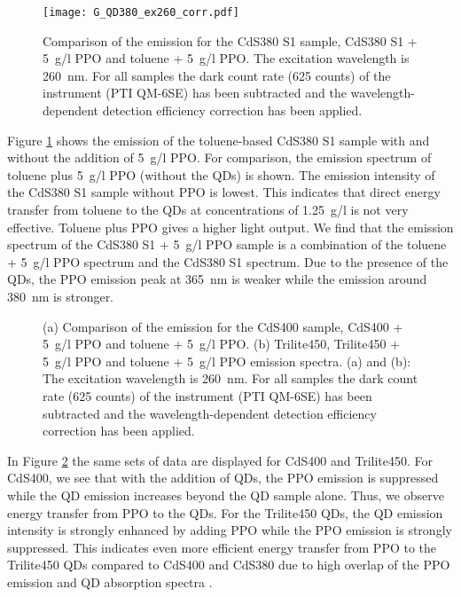 \documentclass[cits]{JINST}
\begin{document}
\begin{figure}
      \begin{center}
        \texttt{[image: G\_QD380\_ex260\_corr.pdf]}
        \caption[]{Comparison of the emission for the CdS380 S1 sample, CdS380 S1 + 5~g/l PPO and toluene + 5~g/l PPO. The excitation wavelength is 260~nm. For all samples the dark count rate (625 counts) of the instrument (PTI QM-6SE) has been subtracted and the wavelength-dependent detection efficiency correction has been applied. \label{G_QD380_ex260_corr}}
        \end{center}
\end{figure}

Figure \ref{G_QD380_ex260_corr} shows the emission of the toluene-based CdS380 S1 sample with and without the addition of 5~g/l PPO. For comparison, the emission spectrum of toluene plus 5~g/l PPO (without the QDs) is shown. The emission intensity of the CdS380 S1 sample without PPO is lowest. This indicates that direct energy transfer from toluene to the QDs at concentrations of 1.25~g/l is not very effective. Toluene plus PPO gives a higher light output. We find that the emission spectrum of the CdS380 S1 + 5~g/l PPO sample is a combination of the toluene + 5~g/l PPO spectrum and the CdS380 S1 spectrum. Due to the presence of the QDs, the PPO emission peak at 365~nm is weaker while the emission around 380~nm is stronger.  

\begin{figure}
      \begin{center}
\caption[]{(a) Comparison of the emission for the CdS400 sample, CdS400 + 5~g/l PPO and toluene + 5~g/l PPO. (b) Trilite450, Trilite450 + 5~g/l PPO and toluene + 5~g/l PPO emission spectra. (a) and (b): The excitation wavelength is 260~nm. For all samples the dark count rate (625 counts) of the instrument (PTI QM-6SE) has been subtracted and the wavelength-dependent detection efficiency correction has been applied. \label{G_QD400_QD450_ex260_corr}}
        \end{center}
\end{figure}

In Figure \ref{G_QD400_QD450_ex260_corr} the same sets of data are displayed for CdS400 and Trilite450. For CdS400, we see that with the addition of QDs, the PPO emission is suppressed while the QD emission increases beyond the QD sample alone. Thus, we observe energy transfer from PPO to the QDs. For the Trilite450 QDs, the QD emission intensity is strongly enhanced by adding PPO while the PPO emission is strongly suppressed.  This indicates even more efficient energy transfer from PPO to the Trilite450 QDs compared to CdS400 and CdS380 due to high overlap of the PPO emission and QD absorption spectra \cite{foerster}.  
\end{document}
